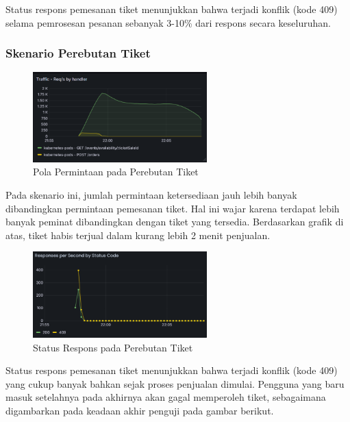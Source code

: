 Status respons pemesanan tiket menunjukkan bahwa terjadi konflik (kode 409) selama pemrosesan pesanan sebanyak 3-10\% dari respons secara keseluruhan.

\pagebreak

\subsubsection{Skenario Perebutan Tiket}

\begin{figure}[htbp]
    \centering
    \includegraphics[width=0.6\textwidth]{resources/chapter-4/pattern-sim-traffic.png}
    \caption{Pola Permintaan pada Perebutan Tiket}
    \label{fig:pattern-sim-traffic}
\end{figure}

Pada skenario ini, jumlah permintaan ketersediaan jauh lebih banyak dibandingkan permintaan pemesanan tiket. Hal ini wajar karena terdapat lebih banyak peminat dibandingkan dengan tiket yang tersedia. Berdasarkan grafik di atas, tiket habis terjual dalam kurang lebih 2 menit penjualan.

\begin{figure}[htbp]
    \centering
    \includegraphics[width=0.6\textwidth]{resources/chapter-4/pattern-sim-order.png}
    \caption{Status Respons pada Perebutan Tiket}
    \label{fig:pattern-sim-order}
\end{figure}

Status respons pemesanan tiket menunjukkan bahwa terjadi konflik (kode 409) yang cukup banyak bahkan sejak proses penjualan dimulai. Pengguna yang baru masuk setelahnya pada akhirnya akan gagal memperoleh tiket, sebagaimana digambarkan pada keadaan akhir penguji pada gambar berikut.

